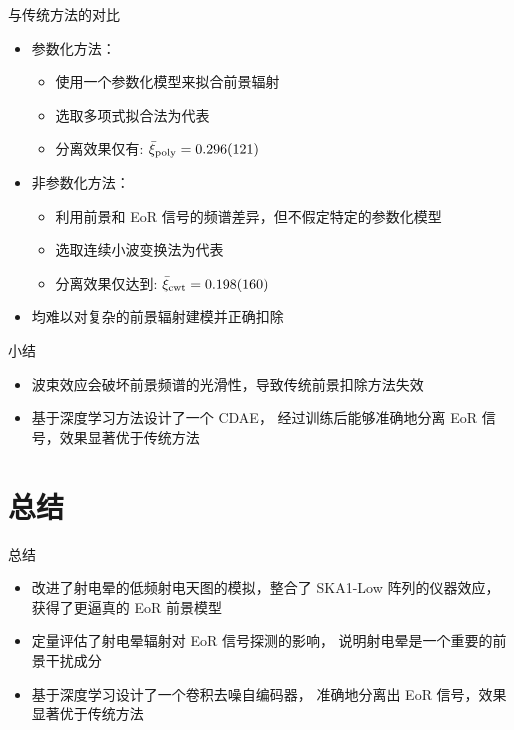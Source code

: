 \documentclass{beamer}
\newcommand{\R}[1]{\text{#1}}  %
\begin{document}
\begin{frame}{与传统方法的对比}
  \begin{itemize}
    \item \alert{参数化方法}：
      \begin{itemize}
        \item 使用一个参数化模型来拟合前景辐射
        \item 选取\alert{多项式拟合法}为代表
        \item 分离效果仅有: $\bar{\xi}_{\R{poly}} = \num{0.296 +- 0.121}$
      \end{itemize}
    \item \alert{非参数化方法}：
      \begin{itemize}
        \item 利用前景和 EoR 信号的频谱差异，但不假定特定的参数化模型
        \item 选取\alert{连续小波变换法}\cite{gu2013}为代表
        \item 分离效果仅达到: $\bar{\xi}_{\R{cwt}} = \num{0.198 +- 0.160}$
      \end{itemize}
    \item 均难以对复杂的前景辐射建模并正确扣除
  \end{itemize}
\end{frame}

\begin{frame}{小结}
  \begin{itemize}
    \item 波束效应会破坏前景频谱的光滑性，导致传统前景扣除方法失效
    \item 基于深度学习方法设计了一个 CDAE，
      经过训练后能够准确地分离 EoR 信号，效果显著优于传统方法
  \end{itemize}
\end{frame}


\section{总结}

\begin{frame}{总\cspace{}结}
  \begin{itemize}
    \item 改进了射电晕的低频射电天图的模拟，整合了 SKA1-Low 阵列的仪器效应，
      获得了更逼真的 EoR 前景模型
    \item 定量评估了射电晕辐射对 EoR 信号探测的影响，
      说明射电晕是一个重要的前景干扰成分
    \item 基于深度学习设计了一个卷积去噪自编码器，
      准确地分离出 EoR 信号，效果显著优于传统方法
  \end{itemize}
\end{frame}
\end{document}
